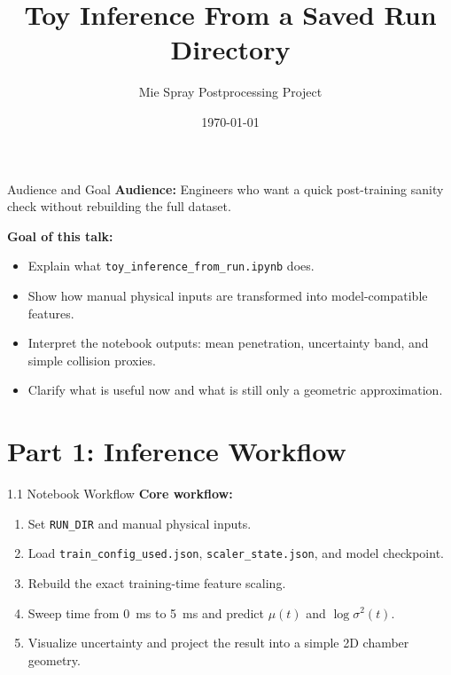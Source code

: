 \documentclass[UTF8,aspectratio=169]{ctexbeamer}
\title{Toy Inference From a Saved Run Directory}
\author{Mie Spray Postprocessing Project}
\date{\today}
\begin{document}
\begin{frame}
  \titlepage
\end{frame}

\begin{frame}{Audience and Goal}
\textbf{Audience:} Engineers who want a quick post-training sanity check without rebuilding the full dataset.

\vspace{0.5em}
\textbf{Goal of this talk:}
\begin{itemize}
  \item Explain what \texttt{toy\_inference\_from\_run.ipynb} does.
  \item Show how manual physical inputs are transformed into model-compatible features.
  \item Interpret the notebook outputs: mean penetration, uncertainty band, and simple collision proxies.
  \item Clarify what is useful now and what is still only a geometric approximation.
\end{itemize}
\end{frame}

\section{Part 1: Inference Workflow}

\begin{frame}{1.1 Notebook Workflow}
\textbf{Core workflow:}
\begin{enumerate}
  \item Set \texttt{RUN\_DIR} and manual physical inputs.
  \item Load \texttt{train\_config\_used.json}, \texttt{scaler\_state.json}, and model checkpoint.
  \item Rebuild the exact training-time feature scaling.
  \item Sweep time from \SI{0}{ms} to \SI{5}{ms} and predict $\mu(t)$ and $\log \sigma^2(t)$.
  \item Visualize uncertainty and project the result into a simple 2D chamber geometry.
\end{enumerate}
\end{frame}
\end{document}
